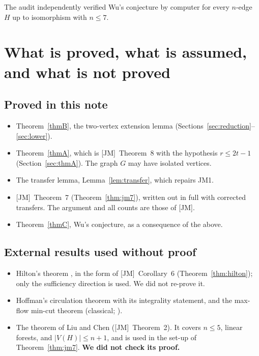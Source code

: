 \documentclass[11pt]{amsart}
\theoremstyle{definition}
\theoremstyle{remark}
\newcommand{\JM}{\textup{[JM]}}
\begin{document}
The audit \cite[\S4]{A4} independently verified Wu's conjecture by computer for every
$n$-edge $H$ up to isomorphism with $n\le7$.

\section{What is proved, what is assumed, and what is not proved}\label{sec:status}

\subsection*{Proved in this note}
\begin{itemize}[leftmargin=*]
\item Theorem~\ref{thmB}, the two-vertex extension lemma (Sections~\ref{sec:reduction}--\ref{sec:lower}).
\item Theorem~\ref{thmA}, which is \JM\ Theorem~8 with the hypothesis $r\le 2t-1$
(Section~\ref{sec:thmA}). The graph $G$ may have isolated vertices.
\item The transfer lemma, Lemma~\ref{lem:transfer}, which repairs JM1.
\item \JM\ Theorem~7 (Theorem~\ref{thm:jm7}), written out in full with corrected transfers.
The argument and all counts are those of \JM.
\item Theorem~\ref{thmC}, Wu's conjecture, as a consequence of the above.
\end{itemize}

\subsection*{External results used without proof}
\begin{itemize}[leftmargin=*]
\item Hilton's theorem \cite{Hilton}, in the form of \JM\ Corollary~6
(Theorem~\ref{thm:hilton}); only the sufficiency direction is used. We did not re-prove it.
\item Hoffman's circulation theorem with its integrality statement, and the max-flow
min-cut theorem (classical; \cite{Hoffman,Schrijver}).
\item The theorem of Liu and Chen \cite{LC} (\JM\ Theorem~2). It covers $n\le5$, linear forests,
and $|V(H)|\le n+1$, and is used in the set-up of Theorem~\ref{thm:jm7}. \textbf{We did not check
its proof.}
\end{itemize}
\end{document}
